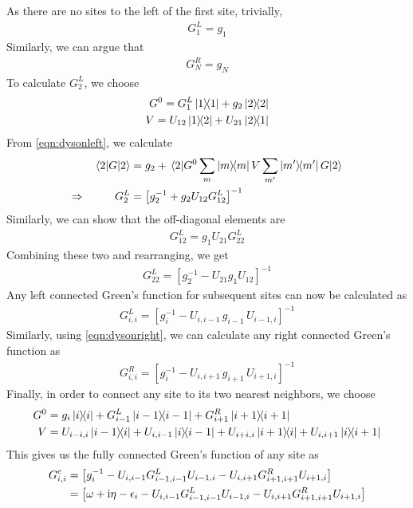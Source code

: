 	As there are no sites to the left of the first site, trivially,
	\begin{align}
		G^{L}_{1} = g_{1}
	\end{align}
	Similarly, we can argue that
	\begin{align}
	G^{R}_{N} = g_{N}
	\end{align}
	To calculate $ G^{L}_{2} $, we choose
	\begin{align}
		G^{0} = G^{L}_{1}\ketbra{1}{1} + g_2 \ketbra{2}{2}\\
		V = U_{12}\ketbra{1}{2} + U_{21}\ketbra{2}{1}
	\end{align}
	From \eqref{eqn:dysonleft}, we calculate
	\begin{align}
		\nonumber&&\mel{2}{G}{2} &= g_2 + \mel{2}{G^{0}\sum_{m}\ketbra{m}{m}V\sum_{m'}\ketbra{m'}{m'}G}{2} \\
		\Rightarrow && G^{L}_{2} &= \left[ g^{-1}_2 + g_2 U_{12} G^{L}_{12} \right]^{-1}
	\end{align}
	Similarly, we can show that the off-diagonal elements are
	\begin{align}
		G^{L}_{12} = g_1 U_{21} G^{L}_{22}
	\end{align}
	Combining these two and rearranging, we get
	\begin{align}
		G^{L}_{22} = \left[ g^{-1}_2 - U_{21} g_1 U_{12}  \right]^{-1}
	\end{align}
	Any left connected Green's function for subsequent sites can now be calculated as
	\begin{align}
		G^{L}_{i,i} = \left[ g^{-1}_i - U_{i,i-1}\,g_{i-1}\,U_{i-1,i}  \right]^{-1}
	\end{align}
	Similarly, using \eqref{eqn:dysonright}, we can calculate any right connected Green's function as
	\begin{align}
		G^{R}_{i,i} = \left[ g^{-1}_i - U_{i,i+1}\,g_{i+1}\,U_{i+1,i}  \right]^{-1}
	\end{align}
	Finally, in order to connect any site to its two nearest neighbors, we choose
	\begin{align}
		G^{0} &= g_{i}\ketbra{i}{i} + G^{L}_{i-1}\ketbra{i-1}{i-1} + G^{R}_{i+1}\ketbra{i+1}{i+1}\\
		V &= U_{i-i,i}\ketbra{i-1}{i} + U_{i,i-1}\ketbra{i}{i-1} + U_{i+i,i}\ketbra{i+1}{i} + U_{i,i+1}\ketbra{i}{i+1}
	\end{align}
	This gives us the fully connected Green's function of any site as
	\begin{align}
		\nonumber G^{c}_{i,i} &= \left[ g^{-1}_{i} - U_{i,i-1} G^{L}_{i-1, i-1} U_{i-1,i} - U_{i,i+1} G^{R}_{i+1,i+1} U_{i+1,i} \right]\\
		&= \left[ \omega + \mathrm{i} \eta -\epsilon_i - U_{i,i-1} G^{L}_{i-1, i-1} U_{i-1,i} - U_{i,i+1} G^{R}_{i+1,i+1} U_{i+1,i} \right]
	\end{align}
